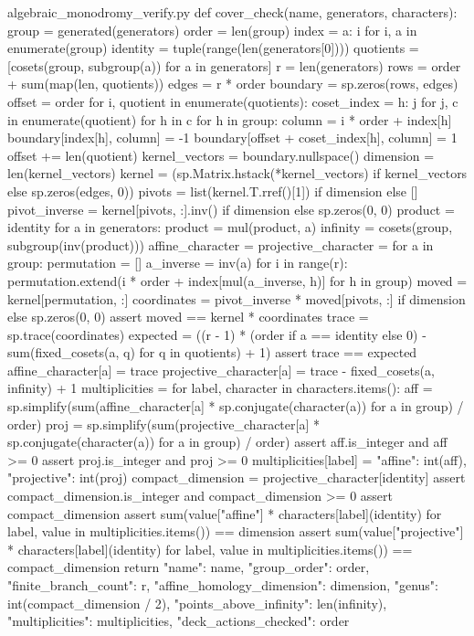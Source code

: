 \begin{filecontents*}[overwrite]{algebraic_monodromy_verify.py}
def cover_check(name, generators, characters):
    group = generated(generators)
    order = len(group)
    index = {a: i for i, a in enumerate(group)}
    identity = tuple(range(len(generators[0])))
    quotients = [cosets(group, subgroup(a)) for a in generators]
    r = len(generators)
    rows = order + sum(map(len, quotients))
    edges = r * order
    boundary = sp.zeros(rows, edges)
    offset = order
    for i, quotient in enumerate(quotients):
        coset_index = {h: j for j, c in enumerate(quotient) for h in c}
        for h in group:
            column = i * order + index[h]
            boundary[index[h], column] = -1
            boundary[offset + coset_index[h], column] = 1
        offset += len(quotient)
    kernel_vectors = boundary.nullspace()
    dimension = len(kernel_vectors)
    kernel = (sp.Matrix.hstack(*kernel_vectors)
              if kernel_vectors else sp.zeros(edges, 0))
    pivots = list(kernel.T.rref()[1]) if dimension else []
    pivot_inverse = kernel[pivots, :].inv() if dimension else sp.zeros(0, 0)
    product = identity
    for a in generators:
        product = mul(product, a)
    infinity = cosets(group, subgroup(inv(product)))
    affine_character = {}
    projective_character = {}
    for a in group:
        permutation = []
        a_inverse = inv(a)
        for i in range(r):
            permutation.extend(i * order + index[mul(a_inverse, h)] for h in group)
        moved = kernel[permutation, :]
        coordinates = pivot_inverse * moved[pivots, :] if dimension else sp.zeros(0, 0)
        assert moved == kernel * coordinates
        trace = sp.trace(coordinates)
        expected = ((r - 1) * (order if a == identity else 0)
                    - sum(fixed_cosets(a, q) for q in quotients) + 1)
        assert trace == expected
        affine_character[a] = trace
        projective_character[a] = trace - fixed_cosets(a, infinity) + 1
    multiplicities = {}
    for label, character in characters.items():
        aff = sp.simplify(sum(affine_character[a] * sp.conjugate(character(a))
                              for a in group) / order)
        proj = sp.simplify(sum(projective_character[a] * sp.conjugate(character(a))
                               for a in group) / order)
        assert aff.is_integer and aff >= 0
        assert proj.is_integer and proj >= 0
        multiplicities[label] = {"affine": int(aff), "projective": int(proj)}
    compact_dimension = projective_character[identity]
    assert compact_dimension.is_integer and compact_dimension >= 0
    assert compact_dimension %
    assert sum(value["affine"] * characters[label](identity)
               for label, value in multiplicities.items()) == dimension
    assert sum(value["projective"] * characters[label](identity)
               for label, value in multiplicities.items()) == compact_dimension
    return {"name": name, "group_order": order, "finite_branch_count": r,
            "affine_homology_dimension": dimension,
            "genus": int(compact_dimension / 2),
            "points_above_infinity": len(infinity),
            "multiplicities": multiplicities,
            "deck_actions_checked": order}



\end{filecontents*}
